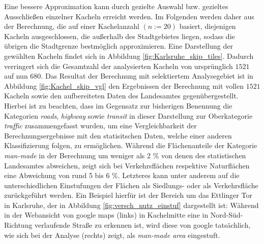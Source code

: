 Eine bessere Approximation kann durch gezielte Auswahl bzw. gezieltes Ausschließen einzelner Kacheln erreicht werden. Im Folgenden werden daher aus der Berechnung, die auf einer Kachelanzahl \((n:=20)\) basiert, diejenigen Kacheln ausgeschlossen, die außerhalb des Stadtgebietes liegen, sodass die übrigen die Stadtgrenze bestmöglich approximieren. Eine Darstellung der gewählten Kacheln findet sich in Abbildung \ref{fig:Karlsruhe_skip_tiles}. Dadurch verringert sich die Gesamtzahl der analysierten Kacheln von  ursprünglich \(1521\) auf nun \(680\). Das Resultat der Berechnung mit selektiertem Analysegebiet ist in Abbildung \ref{fig:Kachel_skip_vgl} den Ergebnissen der Berechnung mit vollen \(1521\) Kacheln sowie den aufbereiteten Daten des Landesamtes gegenübergestellt. Hierbei ist zu beachten, dass im Gegensatz zur bisherigen Benennung die Kategorien \textit{roads}, \textit{highway} sowie \textit{transit} in dieser Darstellung zur Oberkategorie \textit{traffic} zusammengefasst wurden, um eine Vergleichbarkeit der Berechnungsergebnisse mit den statisitschen Daten, welche einer anderen Klassifizierung folgen, zu ermöglichen. Während die Flächenanteile der Kategorie \textit{man-made} in der Berechnung um weniger als  \num{2} \% von denen des statistischen Landesamtes abweichen, zeigt sich bei Verkehrsflächen respektive Naturflächen eine Abweichung von rund \num{5} bis \num{6} \%. Letzteres kann unter anderem auf die unterschiedlichen Einstufungen der Flächen als Siedlungs- oder als Verkehrsfläche zurückgeführt werden. Ein Beispiel hierfür ist der Bereich um das Ettlinger Tor in Karlsruhe, der in Abbildung \ref{fig:versch_nutz_einstuf} dargestellt ist: Während in der Webansicht von google maps (links) in Kachelmitte eine in Nord-Süd-Richtung verlaufende Straße zu erkennen ist, wird diese von google tatsächlich, wie sich bei der Analyse (rechts) zeigt, als \textit{man-made area} eingestuft.\\

